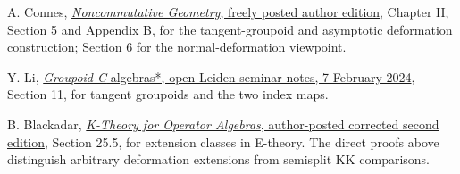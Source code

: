 \documentclass[
  11pt,
]{article}
\begin{document}
A. Connes,
\href{https://alainconnes.org/wp-content/uploads/book94bigpdf.pdf}{\emph{Noncommutative
Geometry}, freely posted author edition}, Chapter II, Section 5 and
Appendix B, for the tangent-groupoid and asymptotic deformation
construction; Section 6 for the normal-deformation viewpoint.

Y. Li,
\href{https://liyuezhao.github.io/notes/groupoid_notes.pdf}{\emph{Groupoid
C}-algebras*, open Leiden seminar notes, 7 February 2024}, Section 11,
for tangent groupoids and the two index maps.

B. Blackadar,
\href{https://www.bruceblackadar.com/Mathematics/book6.pdf}{\emph{K-Theory
for Operator Algebras}, author-posted corrected second edition}, Section
25.5, for extension classes in E-theory. The direct proofs above
distinguish arbitrary deformation extensions from semisplit KK
comparisons.
\end{document}
